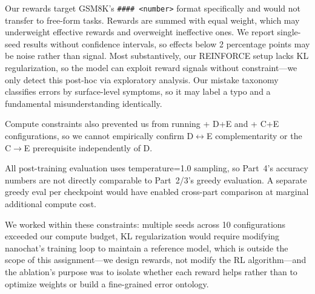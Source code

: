 Our rewards target GSM8K's \texttt{\#\#\#\# <number>} format specifically and would not transfer to free-form tasks.
Rewards are summed with equal weight, which may underweight effective rewards and overweight ineffective ones.
We report single-seed results without confidence intervals, so effects below 2 percentage points may be noise rather than signal.
Most substantively, our REINFORCE setup lacks KL regularization, so the model can exploit reward signals without constraint---we only detect this post-hoc via exploratory analysis.
Our mistake taxonomy classifies errors by surface-level symptoms, so it may label a typo and a fundamental misunderstanding identically.

Compute constraints also prevented us from running + D+E and + C+E configurations, so we cannot empirically confirm D$\leftrightarrow$E complementarity or the C$\to$E prerequisite independently of D.

All post-training evaluation uses temperature=1.0 sampling, so Part~4's accuracy numbers are not directly comparable to Part~2/3's greedy evaluation.
A separate greedy eval per checkpoint would have enabled cross-part comparison at marginal additional compute cost.

We worked within these constraints: multiple seeds across 10 configurations exceeded our compute budget, KL regularization would require modifying nanochat's training loop to maintain a reference model, which is outside the scope of this assignment---we design rewards, not modify the RL algorithm---and the ablation's purpose was to isolate whether each reward helps rather than to optimize weights or build a fine-grained error ontology.
